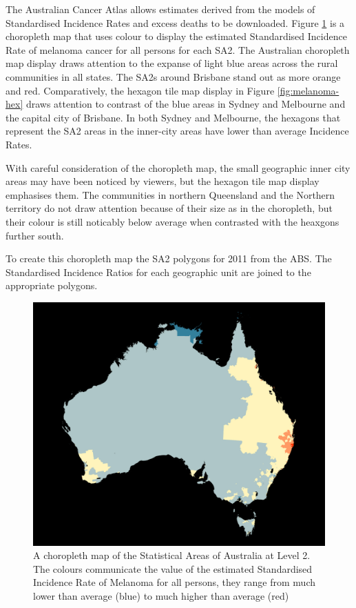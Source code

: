 \documentclass[
]{jss}
\begin{document}
The Australian Cancer Atlas \citep{TACA} allows estimates derived from
the models of Standardised Incidence Rates and excess deaths to be
downloaded. Figure \ref{fig:melanoma-geo} is a choropleth map that uses
colour to display the estimated Standardised Incidence Rate of melanoma
cancer for all persons for each SA2. The Australian choropleth map
display draws attention to the expanse of light blue areas across the
rural communities in all states. The SA2s around Brisbane stand out as
more orange and red. Comparatively, the hexagon tile map display in
Figure \ref{fig:melanoma-hex} draws attention to contrast of the blue
areas in Sydney and Melbourne and the capital city of Brisbane. In both
Sydney and Melbourne, the hexagons that represent the SA2 areas in the
inner-city areas have lower than average Incidence Rates.

With careful consideration of the choropleth map, the small geographic
inner city areas may have been noticed by viewers, but the hexagon tile
map display emphasises them. The communities in northern Queensland and
the Northern territory do not draw attention because of their size as in
the choropleth, but their colour is still noticably below average when
contrasted with the heaxgons further south.

To create this choropleth map the SA2 polygons for 2011 from the ABS.
The Standardised Incidence Ratios for each geographic unit are joined to
the appropriate polygons.

\begin{figure}

{\centering \includegraphics[width=0.6\linewidth]{figures/aus_melanoma_p} 

}

\caption[A choropleth map of the Statistical Areas of Australia at Level 2]{A choropleth map of the Statistical Areas of Australia at Level 2. The colours communicate the value of the estimated Standardised Incidence Rate of Melanoma for all persons, they range from much lower than average (blue) to much higher than average (red)}\label{fig:melanoma-geo}
\end{figure}
\end{document}
